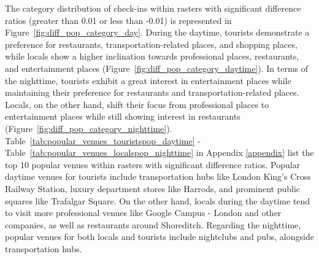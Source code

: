 \documentclass{article}
\theoremstyle{definition}
\theoremstyle{remark}
\begin{document}
The category distribution of check-ins within rasters with significant difference ratios (greater than 0.01 or less than -0.01) is represented in Figure~\ref{fig:diff_pop_category_day}. During the daytime, tourists demonstrate a preference for restaurants, transportation-related places, and shopping places, while locals show a higher inclination towards professional places, restaurants, and entertainment places (Figure~\ref{fig:diff_pop_category_daytime}). In terms of the nighttime, tourists exhibit a great interest in entertainment places while maintaining their preference for restaurants and transportation-related places. Locals, on the other hand, shift their focus from professional places to entertainment places while still showing interest in restaurants (Figure~\ref{fig:diff_pop_category_nighttime}). 
Table~\ref{tab:popular_venues_touristspop_daytime} - Table~\ref{tab:popular_venues_localspop_nighttime} in Appendix \ref{appendix} list the top 10 popular venues within rasters with significant difference ratios. Popular daytime venues for tourists include transportation hubs like London King's Cross Railway Station, luxury department stores like Harrods, and prominent public squares like Trafalgar Square. On the other hand, locals during the daytime tend to visit more professional venues like Google Campus - London and other companies, as well as restaurants around Shoreditch. Regarding the nighttime, popular venues for both locals and tourists include nightclubs and pubs, alongside transportation hubs.
\end{document}
